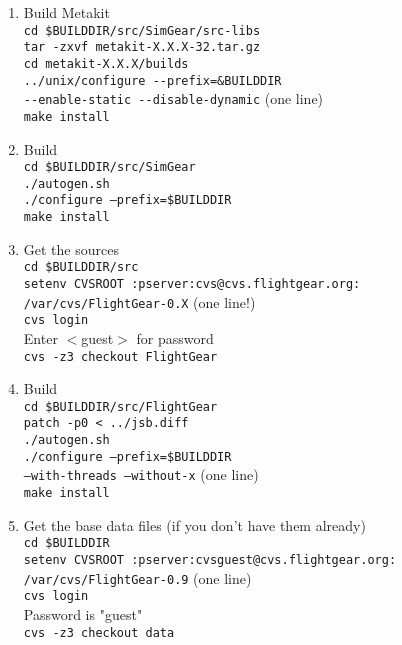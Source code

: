 \begin{enumerate}
\item Build Metakit\\
 \texttt{cd {\$}BUILDDIR/src/SimGear/src-libs}\\
 \texttt{tar -zxvf metakit-X.X.X-32.tar.gz}\\
 \texttt{cd metakit-X.X.X/builds}\\
 \texttt{../unix/configure -$ $-prefix=\&BUILDDIR}\\
 \texttt{-$ $-enable-static -$ $-disable-dynamic} (one line)\\
 \texttt{make install}\\
 
\item Build \SimGear{}\\
 \texttt{cd {\$}BUILDDIR/src/SimGear}\\
 \texttt{./autogen.sh}\\
 \texttt{./configure --prefix={\$}BUILDDIR}\\
 \texttt{make install}\\
 
\item Get the \FlightGear{} sources\\
 \texttt{cd {\$}BUILDDIR/src}\\
 \texttt{setenv CVSROOT :pserver:cvs@cvs.flightgear.org:}\\
 \texttt{/var/cvs/FlightGear-0.X} (one line!)\\
 \texttt{cvs login}\\
 Enter $<$guest$>$ for password\\
 \texttt{cvs -z3 checkout FlightGear}

\item  Build \FlightGear{}\\
 \texttt{cd {\$}BUILDDIR/src/FlightGear}\\
 \texttt{patch -p0 < ../jsb.diff}\\ 
 \texttt{./autogen.sh}\\
 \texttt{./configure --prefix={\$}BUILDDIR }\\
 \texttt{--with-threads --without-x} (one line)\\
 \texttt{make install}
 
\item Get the base data files (if you don't have them already)\\
 \texttt{cd {\$}BUILDDIR}\\
 \texttt{setenv CVSROOT :pserver:cvsguest@cvs.flightgear.org:}\\
 \texttt{/var/cvs/FlightGear-0.9} (one line)\\
 \texttt{cvs login}\\
 Password is "guest"\\
 \texttt{cvs -z3 checkout data}


\end{enumerate}
